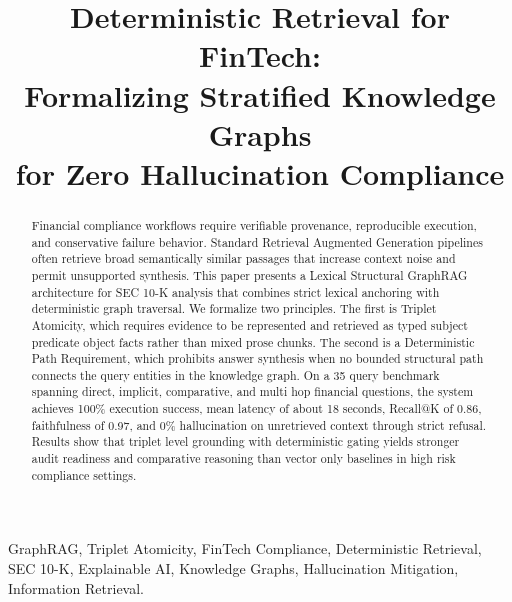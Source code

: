 \documentclass[conference]{IEEEtran}
\begin{document}
\title{Deterministic Retrieval for FinTech:\\
Formalizing Stratified Knowledge Graphs\\
for Zero Hallucination Compliance}

\author{%
}

\maketitle

\begin{abstract}
Financial compliance workflows require verifiable provenance, reproducible execution, and conservative failure behavior. Standard Retrieval Augmented Generation pipelines often retrieve broad semantically similar passages that increase context noise and permit unsupported synthesis. This paper presents a Lexical Structural GraphRAG architecture for SEC 10-K analysis that combines strict lexical anchoring with deterministic graph traversal. We formalize two principles. The first is Triplet Atomicity, which requires evidence to be represented and retrieved as typed subject predicate object facts rather than mixed prose chunks. The second is a Deterministic Path Requirement, which prohibits answer synthesis when no bounded structural path connects the query entities in the knowledge graph. On a 35 query benchmark spanning direct, implicit, comparative, and multi hop financial questions, the system achieves 100\% execution success, mean latency of about 18 seconds, Recall@K of 0.86, faithfulness of 0.97, and 0\% hallucination on unretrieved context through strict refusal. Results show that triplet level grounding with deterministic gating yields stronger audit readiness and comparative reasoning than vector only baselines in high risk compliance settings.
\end{abstract}

\begin{IEEEkeywords}
GraphRAG, Triplet Atomicity, FinTech Compliance, Deterministic Retrieval, SEC 10-K, Explainable AI, Knowledge Graphs, Hallucination Mitigation, Information Retrieval.
\end{IEEEkeywords}
\end{document}

